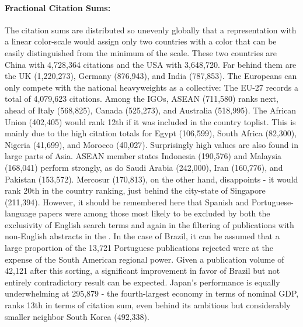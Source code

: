 \documentclass{article}
\begin{document}
	\paragraph{Fractional Citation Sums:} The citation sums are distributed so unevenly globally that a representation with a linear color-scale would assign only two countries with a color that can be easily distinguished from the minimum of the scale. These two countries are China with 4,728,364 citations and the USA with 3,648,720. Far behind them are the UK (1,220,273), Germany (876,943), and India (787,853). The Europeans can only compete with the national heavyweights as a collective: The EU-27 records a total of 4,079,623 citations. Among the IGOs, ASEAN (711,580) ranks next, ahead of Italy (568,825), Canada (525,273), and Australia (518,995). The African Union (402,405) would rank 12th if it was included in the country toplist. This is mainly due to the high citation totals for Egypt (106,599), South Africa (82,300), Nigeria (41,699), and Morocco (40,027). Surprisingly high values are also found in large parts of Asia. ASEAN member states Indonesia (190,576) and Malaysia (168,041) perform strongly, as do Saudi Arabia (242,000), Iran (160,776), and Pakistan (153,572). Mercosur (170,813), on the other hand, disappoints - it would rank 20th in the country ranking, just behind the city-state of Singapore (211,394). However, it should be remembered here that Spanish and Portuguese-language papers were among those most likely to be excluded by both the exclusivity of English search terms and again in the filtering of publications with non-English abstracts in the . In the case of Brazil, it can be assumed that a large proportion of the 13,721 Portuguese publications rejected were at the expense of the South American regional power. Given a publication volume of 42,121 after this sorting, a significant improvement in favor of Brazil but not entirely contradictory result can be expected. Japan's performance is equally underwhelming at 295,879 - the fourth-largest economy in terms of nominal GDP, ranks 13th in terms of citation sum, even behind its ambitious but considerably smaller neighbor South Korea (492,338).
	
\end{document}
